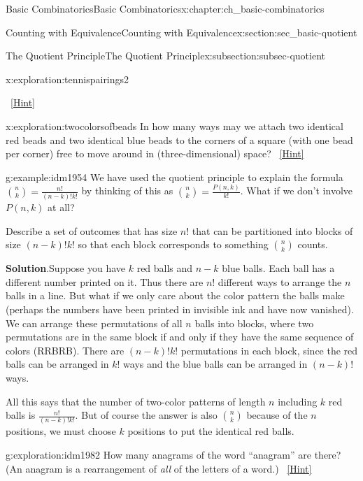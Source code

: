 \documentclass[oneside,10pt,]{book}
\numberwithin{equation}{chapter}
\begin{document}
\begin{chapterptx}{Basic Combinatorics}{}{Basic Combinatorics}{}{}{x:chapter:ch_basic-combinatorics}
\begin{sectionptx}{Counting with Equivalence}{}{Counting with Equivalence}{}{}{x:section:sec_basic-quotient}
\begin{subsectionptx}{The Quotient Principle}{}{The Quotient Principle}{}{}{x:subsection:subsec-quotient}
\begin{exploration}{}{x:exploration:tennispairings2}
\begin{enumerate}[font=\bfseries,label=(\alph*),ref=\alph*]
\qquad~\hfill{\tiny\hyperlink{g:hint:idm1923-back}{[Hint]}}\end{enumerate}
\end{exploration}
\begin{exploration}{}{x:exploration:twocolorsofbeads}%
In how many ways may we attach two identical red beads and two identical blue beads to the corners of a square (with one bead per corner) free to move around in (three-dimensional) space?%
\qquad~\hfill{\tiny\hyperlink{g:hint:idm1946-back}{[Hint]}}\end{exploration}
\begin{example}{}{g:example:idm1954}%
We have used the quotient principle to explain the formula \(\binom{n}{k} = \frac{n!}{(n-k)!k!}\) by thinking of this as \(\binom{n}{k} = \frac{P(n,k)}{k!}\).  What if we don't involve \(P(n,k)\) at all?%
\par
Describe a set of outcomes that has size \(n!\) that can be partitioned into blocks of size \((n-k)!k!\) so that each block corresponds to something \(\binom{n}{k}\) counts.%
\par\smallskip%
\noindent\textbf{Solution}.\hypertarget{g:solution:idm1964}{}\quad{}Suppose you have \(k\) red balls and \(n-k\) blue balls.  Each ball has a different number printed on it.  Thus there are \(n!\) different ways to arrange the \(n\) balls in a line.  But what if we only care about the color pattern the balls make (perhaps the numbers have been printed in invisible ink and have now vanished).  We can arrange these permutations of all \(n\) balls into blocks, where two permutations are in the same block if and only if they have the same sequence of colors (RRBRB\textellipsis{}).  There are \((n-k)!k!\) permutations in each block, since the red balls can be arranged in \(k!\) ways and the blue balls can be arranged in \((n-k)!\) ways.%
\par
All this says that the number of two-color patterns of length \(n\) including \(k\) red balls is \(\frac{n!}{(n-k)!k!}\).  But of course the answer is also \(\binom{n}{k}\) because of the \(n\) positions, we must choose \(k\) positions to put the identical red balls.%
\end{example}
\begin{exploration}{}{g:exploration:idm1982}%
How many anagrams of the word ``anagram'' are there? (An anagram is a rearrangement of \emph{all} of the letters of a word.)%
\qquad~\hfill{\tiny\hyperlink{g:hint:idm1987-back}{[Hint]}}\end{exploration}
\end{subsectionptx}

\end{sectionptx}
\end{chapterptx}
\end{document}
